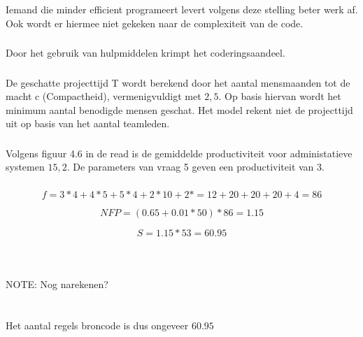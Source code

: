 \documentclass[a4paper,titlepage]{artikel1}
\begin{document}
   \subsubsection[Opdracht 2]{}
   Iemand die minder efficient programeert levert volgens deze stelling beter werk af. Ook wordt er hiermee niet gekeken naar de complexiteit van de code.
   
   \subsubsection[Opdracht 3]{}
   Door het gebruik van hulpmiddelen krimpt het coderingsaandeel.
   
   \subsubsection[Opdracht 4]{}
   De geschatte projecttijd T wordt berekend door het aantal mensmaanden tot de macht c (Compactheid), vermenigvuldigt met $2,5$. Op basis hiervan wordt het minimum aantal benodigde mensen geschat. Het model rekent niet de projecttijd uit op basis van het aantal teamleden.

   \subsubsection[Opdracht 5]{}
   Volgens figuur 4.6 in de read is de gemiddelde productiviteit voor administatieve systemen $15,2$. De parameters van vraag 5 geven een productiviteit van $3$.
   
   \subsubsection[Opdracht 6]{}
   \begin{displaymath}
    f=3*4+4*5+5*4+2*10+2*=12+20+20+20+4=86
   \end{displaymath}
   
   \begin{displaymath}
    NFP=(0.65+0.01*50)*86=1.15
   \end{displaymath}
   
   \begin{displaymath}
    S=1.15*53=60.95
   \end{displaymath}
   \\\\\\NOTE: Nog narekenen?\\\\\\
   Het aantal regels broncode is dus ongeveer $60.95$
\end{document}

